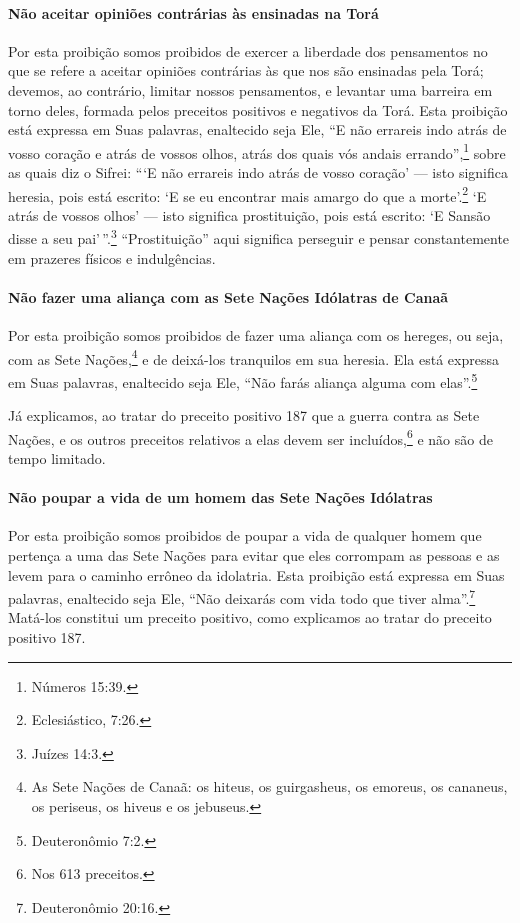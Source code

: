\paragraph{Não aceitar opiniões contrárias às ensinadas na Torá}

Por esta proibição somos proibidos de exercer a liberdade dos
pensamentos no que se refere a aceitar opiniões contrárias às que nos
são ensinadas pela Torá; devemos, ao contrário, limitar nossos
pensamentos, e levantar uma barreira em torno deles, formada pelos
preceitos positivos e negativos da Torá. Esta proibição está expressa
em Suas palavras, enaltecido seja Ele, ``E não errareis indo atrás de
vosso coração e atrás de vossos olhos, atrás dos quais vós andais
errando'',\footnote{Números 15:39.} sobre as quais diz o Sifrei: ```E não
errareis indo atrás de vosso coração' --- isto significa heresia, pois
está escrito: `E se eu encontrar mais amargo do que a
morte'.\footnote{Eclesiástico, 7:26.} `E atrás de vossos olhos' --- isto
significa prostituição, pois está escrito: `E Sansão disse a seu
pai'\,''.\footnote{Juízes 14:3.} ``Prostituição'' aqui significa perseguir
e pensar constantemente em prazeres físicos e indulgências.

\paragraph{Não fazer uma aliança com as Sete Nações Idólatras de Canaã}

Por esta proibição somos proibidos de fazer uma aliança com os hereges,
ou seja, com as Sete Nações,\footnote{As Sete Nações de Canaã: os hiteus, os guirgasheus, os emoreus, os cananeus, os periseus, os hiveus e os jebuseus.} e de deixá-los tranquilos em sua heresia. Ela está expressa em Suas palavras,
enaltecido seja Ele, ``Não farás aliança alguma com elas''.\footnote{Deuteronômio
7:2.}

Já explicamos, ao tratar do preceito positivo 187 que a guerra contra as Sete Nações, e os outros preceitos relativos a elas devem ser
incluídos,\footnote{Nos 613 preceitos.} e não são de tempo limitado.

\paragraph{Não poupar a vida de um homem das Sete Nações Idólatras}

Por esta proibição somos proibidos de poupar a vida de qualquer homem
que pertença a uma das Sete Nações para evitar que eles corrompam as
pessoas e as levem para o caminho errôneo da idolatria. Esta proibição
está expressa em Suas palavras, enaltecido seja Ele, ``Não deixarás com
vida todo que tiver alma''.\footnote{Deuteronômio 20:16.} Matá-los constitui um
preceito positivo, como explicamos ao tratar do preceito positivo 187.

